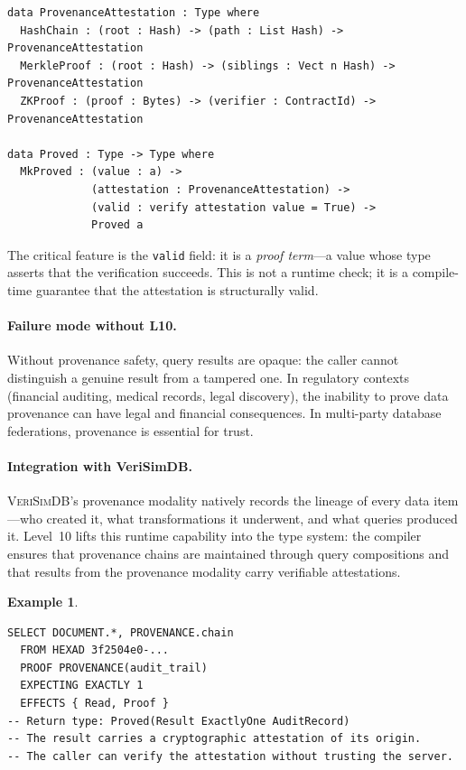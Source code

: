 \documentclass[11pt,a4paper]{article}
\newtheorem{example}[theorem]{Example}
\newcommand{\VeriSimDB}{\textsc{VeriSimDB}}
\newcommand{\LevelN}[1]{\textsf{L#1}}
\begin{document}
\begin{lstlisting}[language=Idris2]
data ProvenanceAttestation : Type where
  HashChain : (root : Hash) -> (path : List Hash) -> ProvenanceAttestation
  MerkleProof : (root : Hash) -> (siblings : Vect n Hash) -> ProvenanceAttestation
  ZKProof : (proof : Bytes) -> (verifier : ContractId) -> ProvenanceAttestation

data Proved : Type -> Type where
  MkProved : (value : a) ->
             (attestation : ProvenanceAttestation) ->
             (valid : verify attestation value = True) ->
             Proved a
\end{lstlisting}

The critical feature is the \texttt{valid} field: it is a
\emph{proof term}---a value whose type asserts that the verification
succeeds.  This is not a runtime check; it is a compile-time
guarantee that the attestation is structurally valid.

\paragraph{Failure mode without \LevelN{10}.}
Without provenance safety, query results are opaque: the caller
cannot distinguish a genuine result from a tampered one.  In
regulatory contexts (financial auditing, medical records, legal
discovery), the inability to prove data provenance can have
legal and financial consequences.  In multi-party database
federations, provenance is essential for trust.

\paragraph{Integration with VeriSimDB.}
\VeriSimDB{}'s provenance modality natively records the
lineage of every data item---who created it, what transformations
it underwent, and what queries produced it.  Level~10 lifts this
runtime capability into the type system: the compiler ensures that
provenance chains are maintained through query compositions and that
results from the provenance modality carry verifiable attestations.

\begin{example}
\begin{lstlisting}[language=VCL]
SELECT DOCUMENT.*, PROVENANCE.chain
  FROM HEXAD 3f2504e0-...
  PROOF PROVENANCE(audit_trail)
  EXPECTING EXACTLY 1
  EFFECTS { Read, Proof }
-- Return type: Proved(Result ExactlyOne AuditRecord)
-- The result carries a cryptographic attestation of its origin.
-- The caller can verify the attestation without trusting the server.
\end{lstlisting}
\end{example}
\end{document}

